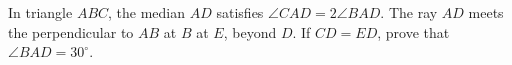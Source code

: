 In triangle $ABC$, the median $AD$ satisfies $\angle CAD=2\angle BAD$. The ray $AD$ meets the perpendicular to $AB$ at $B$ at $E$, beyond $D$. If $CD=ED$, prove that $\angle BAD=30^\circ$.
